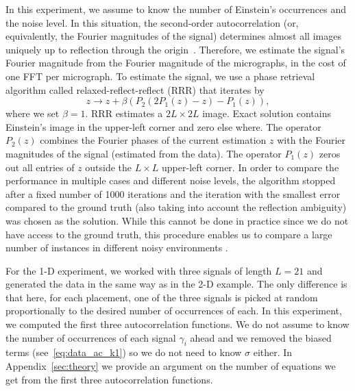 \documentclass[english,11pt]{article}
\newcommand{\1}{\mathbf{1}}
\newcommand{\TODO}[1]{{\color{red}{[#1]}}}
\numberwithin{equation}{section}
\theoremstyle{plain}
\theoremstyle{definition}
\theoremstyle{remark}
\theoremstyle{plain}
\theoremstyle{remark}
\theoremstyle{plain}
\theoremstyle{plain}
\begin{document}
In this experiment, we assume to know the number of Einstein's occurrences and the noise level. 
In this situation, the second-order autocorrelation (or, equivalently, the Fourier magnitudes of the signal) determines  almost all images  uniquely up to reflection through the origin~\cite{hayes1982reconstruction,bendory2017fourier}. 
Therefore, we estimate the signal's Fourier magnitude from the Fourier magnitude of the micrographs, in the cost of one  FFT per micrograph.
To estimate the signal, we use a phase retrieval algorithm called relaxed-reflect-reflect (RRR) that iterates by
\begin{equation}
z \rightarrow z + \beta (P_2(2P_1(z) - z) - P_1(z)),
\end{equation}
where we set $\beta=1$.
RRR estimates a $2L\times 2L$ image. Exact solution contains Einstein's image in the upper-left corner and zero else where. The operator $P_2(z)$ combines the Fourier phases of  the current estimation $z$ with the Fourier magnitudes of the signal  (estimated from the data). The operator $P_1(z)$ zeros out all entries of $z$ outside the $L\times L$ upper-left corner. 
In order to compare the performance in multiple cases and different noise levels, the algorithm stopped after a fixed number of 1000 iterations and the iteration with the smallest error compared to the ground truth (also taking into account the reflection ambiguity) was chosen as the solution. While this cannot be done in practice since we do not have access to the ground truth, this procedure enables us to compare a large number of instances in different noisy environments \TODO{Note the last two sentences!}.

For the 1-D experiment, we worked with three signals of length $L = 21$ and generated the data in the same way as in the 2-D example.
The only difference is that here, for each
placement, one of the three signals is picked at random proportionally to the desired number
of occurrences of each.
In this experiment, we computed the first three autocorrelation functions. 
We do not assume to know the number of occurrences of each signal $\gamma_i$ ahead and we removed the biased terms (see~\eqref{eq:data_ac_k1}) so we do not need to know $\sigma$ either. 
In Appendix~\ref{sec:theory} we provide an argument on the number of equations we get from the first three autocorrelation functions. 
\end{document}
